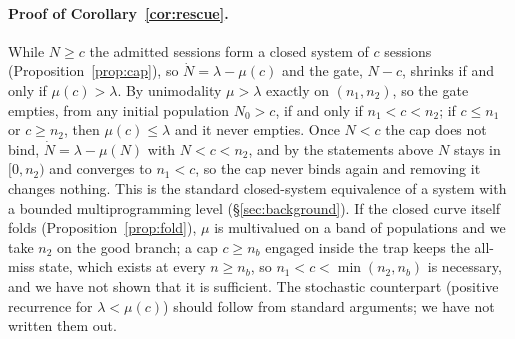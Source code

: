 \paragraph{Proof of Corollary~\ref{cor:rescue}.} While $N\ge c$ the admitted sessions form a closed system of $c$ sessions (Proposition~\ref{prop:cap}), so $\dot N=\lambda-\mu(c)$ and the gate, $N-c$, shrinks if and only if $\mu(c)>\lambda$. By unimodality $\mu>\lambda$ exactly on $(n_1,n_2)$, so the gate empties, from any initial population $N_0>c$, if and only if $n_1<c<n_2$; if $c\le n_1$ or $c\ge n_2$, then $\mu(c)\le\lambda$ and it never empties. Once $N<c$ the cap does not bind, $\dot N=\lambda-\mu(N)$ with $N<c<n_2$, and by the statements above $N$ stays in $[0,n_2)$ and converges to $n_1<c$, so the cap never binds again and removing it changes nothing. This is the standard closed-system equivalence of a system with a bounded multiprogramming level (\S\ref{sec:background}). If the closed curve itself folds (Proposition~\ref{prop:fold}), $\mu$ is multivalued on a band of populations and we take $n_2$ on the good branch; a cap $c\ge n_b$ engaged inside the trap keeps the all-miss state, which exists at every $n\ge n_b$, so $n_1<c<\min(n_2,n_b)$ is necessary, and we have not shown that it is sufficient. The stochastic counterpart (positive recurrence for $\lambda<\mu(c)$) should follow from standard arguments; we have not written them out.
